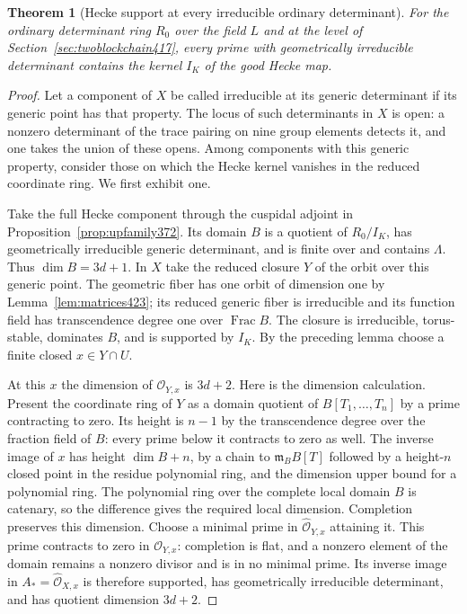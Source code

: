 \documentclass[a4paper,11pt]{article}
\newtheorem{theorem}[proposition]{Theorem}
\theoremstyle{definition}
\theoremstyle{remark}
\numberwithin{equation}{section}
\begin{document}
\begin{theorem}[Hecke support at every irreducible ordinary determinant]\leavevmode
\label{thm:globalhecke423}
For the ordinary determinant ring \(R_0\) over the field \(L\)
and at the level of Section~\ref{sec:twoblockchain417}, every
prime with geometrically irreducible determinant contains the
kernel \(I_K\) of the good Hecke map.
\end{theorem}
\begin{proof}
Let a component of \(X\) be called irreducible at its generic
determinant if its generic point has that property. The locus
of such determinants in \(X\) is open: a nonzero determinant
of the trace pairing on nine group elements detects it, and
one takes the union of these opens. Among components with
this generic property, consider those on which the Hecke
kernel vanishes in the reduced coordinate ring. We first
exhibit one.

Take the full Hecke component through the cuspidal adjoint in
Proposition~\ref{prop:upfamily372}. Its domain \(B\) is a
quotient of \(R_0/I_K\), has geometrically irreducible generic
determinant, and is finite over and contains \(\Lambda\).
Thus \(\dim B=3d+1\). In \(X\) take the reduced closure \(Y\)
of the orbit over this generic point. The geometric fiber has
one orbit of dimension one by Lemma~\ref{lem:matrices423};
its reduced generic fiber is irreducible and its function
field has transcendence degree one over \(\operatorname{Frac}B\).
The closure is irreducible, torus-stable, dominates \(B\),
and is supported by \(I_K\). By the preceding lemma choose
a finite closed \(x\in Y\cap U\).

At this \(x\) the dimension of \(\mathcal O_{Y,x}\) is \(3d+2\).
Here is the dimension calculation. Present the coordinate ring
of \(Y\) as a domain quotient of \(B[T_1,\ldots,T_n]\) by a
prime contracting to zero. Its height is \(n-1\) by the
transcendence degree over the fraction field of \(B\): every
prime below it contracts to zero as well. The inverse image
of \(x\) has height \(\dim B+n\), by a chain to
\(\mathfrak m_B B[T]\) followed by a height-\(n\) closed point
in the residue polynomial ring, and the dimension upper bound
for a polynomial ring. The polynomial ring over the complete
local domain \(B\) is catenary, so the difference gives the
required local dimension. Completion preserves this dimension.
Choose a minimal prime in \(\widehat{\mathcal O}_{Y,x}\)
attaining it. This prime contracts to zero in
\(\mathcal O_{Y,x}\): completion is flat, and a nonzero element
of the domain remains a nonzero divisor and is in no minimal
prime. Its inverse image in
\(A_*=\widehat{\mathcal O}_{X,x}\) is therefore supported,
has geometrically irreducible determinant, and has quotient
dimension \(3d+2\).


\end{proof}
\end{document}
